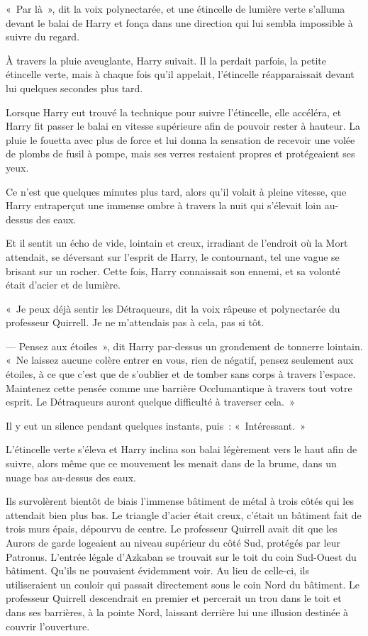 «~Par là~», dit la voix polynectarée, et une étincelle de lumière verte s'alluma devant le balai de Harry et fonça dans une direction qui lui sembla impossible à suivre du regard.

À travers la pluie aveuglante, Harry suivait. Il la perdait parfois, la petite étincelle verte, mais à chaque fois qu'il appelait, l'étincelle réapparaissait devant lui quelques secondes plus tard.

Lorsque Harry eut trouvé la technique pour suivre l'étincelle, elle accéléra, et Harry fit passer le balai en vitesse supérieure afin de pouvoir rester à hauteur. La pluie le fouetta avec plus de force et lui donna la sensation de recevoir une volée de plombs de fusil à pompe, mais ses verres restaient propres et protégeaient ses yeux.

Ce n'est que quelques minutes plus tard, alors qu'il volait à pleine vitesse, que Harry entraperçut une immense ombre à travers la nuit qui s'élevait loin au-dessus des eaux.

Et il sentit un écho de vide, lointain et creux, irradiant de l'endroit où la Mort attendait, se déversant sur l'esprit de Harry, le contournant, tel une vague se brisant sur un rocher. Cette fois, Harry connaissait son ennemi, et sa volonté était d'acier et de lumière.

«~Je peux déjà sentir les Détraqueurs, dit la voix râpeuse et polynectarée du professeur Quirrell. Je ne m'attendais pas à cela, pas si tôt.

--- Pensez aux étoiles~», dit Harry par-dessus un grondement de tonnerre lointain. «~Ne laissez aucune colère entrer en vous, rien de négatif, pensez seulement aux étoiles, à ce que c'est que de s'oublier et de tomber sans corps à travers l'espace. Maintenez cette pensée comme une barrière Occlumantique à travers tout votre esprit. Le Détraqueurs auront quelque difficulté à traverser cela.~»

Il y eut un silence pendant quelques instants, puis~: «~Intéressant.~»

L'étincelle verte s'éleva et Harry inclina son balai légèrement vers le haut afin de suivre, alors même que ce mouvement les menait dans de la brume, dans un nuage bas au-dessus des eaux.

Ils survolèrent bientôt de biais l'immense bâtiment de métal à trois côtés qui les attendait bien plus bas. Le triangle d'acier était creux, c'était un bâtiment fait de trois murs épais, dépourvu de centre. Le professeur Quirrell avait dit que les Aurors de garde logeaient au niveau supérieur du côté Sud, protégés par leur Patronus. L'entrée légale d'Azkaban se trouvait sur le toit du coin Sud-Ouest du bâtiment. Qu'ils ne pouvaient évidemment voir. Au lieu de celle-ci, ils utiliseraient un couloir qui passait directement sous le coin Nord du bâtiment. Le professeur Quirrell descendrait en premier et percerait un trou dans le toit et dans ses barrières, à la pointe Nord, laissant derrière lui une illusion destinée à couvrir l'ouverture.

